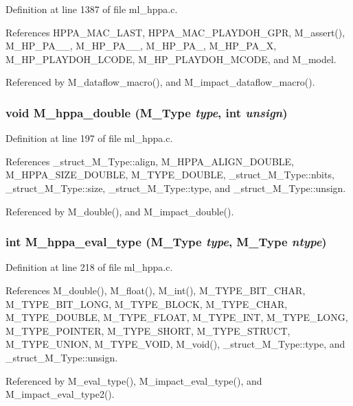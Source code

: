 Definition at line 1387 of file ml\_\-hppa.c.

References HPPA\_\-MAC\_\-LAST, HPPA\_\-MAC\_\-PLAYDOH\_\-GPR, M\_\-assert(), M\_\-HP\_\-PA\_\_, M\_\-HP\_\-PA\_\_, M\_\-HP\_\-PA\_, M\_\-HP\_\-PA\_\-X, M\_\-HP\_\-PLAYDOH\_\-LCODE, M\_\-HP\_\-PLAYDOH\_\-MCODE, and M\_\-model.

Referenced by M\_\-dataflow\_\-macro(), and M\_\-impact\_\-dataflow\_\-macro().
\subsubsection{\setlength{\rightskip}{0pt plus 5cm}void M\_\-hppa\_\-double (\bf{M\_\-Type} {\em type}, int {\em unsign})}\label{m__hppa_8h_36512d3fc7f9e32d3ded009049067802}




Definition at line 197 of file ml\_\-hppa.c.

References \_\-struct\_\-M\_\-Type::align, M\_\-HPPA\_\-ALIGN\_\-DOUBLE, M\_\-HPPA\_\-SIZE\_\-DOUBLE, M\_\-TYPE\_\-DOUBLE, \_\-struct\_\-M\_\-Type::nbits, \_\-struct\_\-M\_\-Type::size, \_\-struct\_\-M\_\-Type::type, and \_\-struct\_\-M\_\-Type::unsign.

Referenced by M\_\-double(), and M\_\-impact\_\-double().
\subsubsection{\setlength{\rightskip}{0pt plus 5cm}int M\_\-hppa\_\-eval\_\-type (\bf{M\_\-Type} {\em type}, \bf{M\_\-Type} {\em ntype})}\label{m__hppa_8h_888352af2b57db93f3b85cf7f4e0465e}




Definition at line 218 of file ml\_\-hppa.c.

References M\_\-double(), M\_\-float(), M\_\-int(), M\_\-TYPE\_\-BIT\_\-CHAR, M\_\-TYPE\_\-BIT\_\-LONG, M\_\-TYPE\_\-BLOCK, M\_\-TYPE\_\-CHAR, M\_\-TYPE\_\-DOUBLE, M\_\-TYPE\_\-FLOAT, M\_\-TYPE\_\-INT, M\_\-TYPE\_\-LONG, M\_\-TYPE\_\-POINTER, M\_\-TYPE\_\-SHORT, M\_\-TYPE\_\-STRUCT, M\_\-TYPE\_\-UNION, M\_\-TYPE\_\-VOID, M\_\-void(), \_\-struct\_\-M\_\-Type::type, and \_\-struct\_\-M\_\-Type::unsign.

Referenced by M\_\-eval\_\-type(), M\_\-impact\_\-eval\_\-type(), and M\_\-impact\_\-eval\_\-type2().
